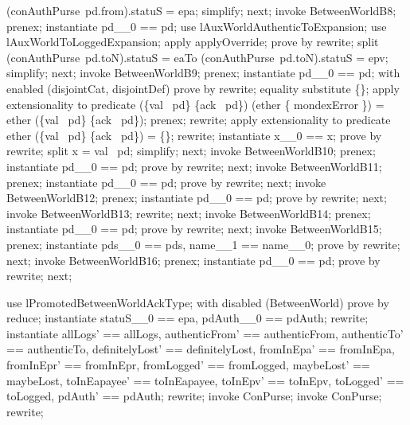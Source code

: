 \begin{LPScript}
\begin{zproof}[lPromotedBetweenWorldAckType]
          \lor (conAuthPurse~pd.from).statuS = epa;
        simplify;
    next;
        invoke BetweenWorldB8;
        prenex;
        instantiate pd\_\_0 == pd;
        use lAuxWorldAuthenticToExpansion;
        use lAuxWorldToLoggedExpansion;
        apply applyOverride;
        prove by rewrite;
        split (conAuthPurse~pd.toN).statuS = eaTo
            \lor (conAuthPurse~pd.toN).statuS = epv;
        simplify;
    next;
        invoke BetweenWorldB9;
        prenex;
        instantiate pd\_\_0 == pd;
        with enabled (disjointCat, disjointDef) prove by rewrite;
        equality substitute \{\};
        apply extensionality to predicate
            (\{val~ pd\} \cup \{ack~ pd\}) \cap (ether \cup \{ mondexError \})
            = ether \cap (\{val~ pd\} \cup \{ack~ pd\});
        prenex;
        rewrite;
        apply extensionality to predicate
            ether \cap (\{val~ pd\} \cup \{ack~ pd\}) = \{\};
        rewrite;
        instantiate x\_\_0 == x;
        prove by rewrite;
        split x = val~ pd;
        simplify;
    next;
        invoke BetweenWorldB10;
        prenex;
        instantiate pd\_\_0 == pd;
        prove by rewrite;
    next;
        invoke BetweenWorldB11;
        prenex;
        instantiate pd\_\_0 == pd;
        prove by rewrite;
    next;
        invoke BetweenWorldB12;
        prenex;
        instantiate pd\_\_0 == pd;
        prove by rewrite;
    next;
        invoke BetweenWorldB13;
        rewrite;
    next;
        invoke BetweenWorldB14;
        prenex;
        instantiate pd\_\_0 == pd;
        prove by rewrite;
    next;
        invoke BetweenWorldB15;
        prenex;
        instantiate pds\_\_0 == pds, name\_\_1 == name\_\_0;
        prove by rewrite;
    next;
        invoke BetweenWorldB16;
        prenex;
        instantiate pd\_\_0 == pd;
        prove by rewrite;
    next;
\end{zproof}\end{LPScript}

\begin{LPScript}\begin{zproof}[tBetwAckOkayPRE]
    use lPromotedBetweenWorldAckType;
    with disabled (BetweenWorld) prove by reduce;
    instantiate statuS\_\_0 == epa, pdAuth\_\_0 == pdAuth;
    rewrite;
    instantiate allLogs' == allLogs, authenticFrom' == authenticFrom,
        authenticTo' == authenticTo, definitelyLost' == definitelyLost,
        fromInEpa' == fromInEpa, fromInEpr' == fromInEpr,
        fromLogged' == fromLogged, maybeLost' == maybeLost,
        toInEapayee' == toInEapayee, toInEpv' == toInEpv,
        toLogged' == toLogged, pdAuth' == pdAuth;
    rewrite;
    invoke \Delta ConPurse;
    invoke ConPurse;
    rewrite;
\end{zproof}\end{LPScript}

